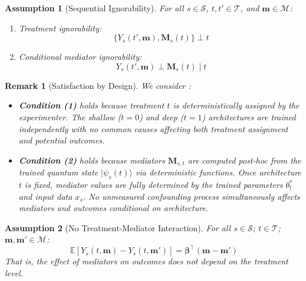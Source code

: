 \documentclass[
    reprint,
    amsmath, amssymb,
    aps,
    floatfix,
    nofootinbib
]{revtex4-1}
\newtheorem{assumption}{Assumption}
\newtheorem{remark}{Remark}
\begin{document}
\begin{assumption}[Sequential Ignorability]\label{assum:sequential_ignorability}
For all $s \in \mathcal{S}$, $t, t' \in \mathcal{T}$, and $\bm{m} \in \mathcal{M}$:
\begin{enumerate}
    \item Treatment ignorability: 
    \begin{equation}
         \{Y_s(t', \bm{m}), \bm{M}_s(t)\} \perp t
    \end{equation}
   
    \item Conditional mediator ignorability:
    \begin{equation}
        Y_s(t', \bm{m}) \perp \bm{M}_s(t) \mid t
    \end{equation}
\end{enumerate}
\end{assumption}

\begin{remark}[Satisfaction by Design] We consider : 
\begin{itemize}
    \item \textbf{Condition (1)} holds because treatment $t$ is deterministically assigned by the experimenter. The shallow ($t=0$) and deep ($t=1$) architectures are trained independently with no common causes affecting both treatment assignment and potential outcomes. 
    \item \textbf{Condition (2)} holds because mediators $\bm{M}_{s,t}$ are computed post-hoc from the trained quantum state $|\psi_s(t)\rangle$ via deterministic functions. Once architecture $t$ is fixed, mediator values are fully determined by the trained parameters $\theta_t^*$ and input data $x_s$. No unmeasured confounding process simultaneously affects mediators and outcomes conditional on architecture.
\end{itemize}
\end{remark}

\begin{assumption}[No Treatment-Mediator Interaction]\label{assum:no_interaction}  For all $s \in \mathcal{S}$; $t \in \mathcal{T}$; $\bm{m}, \bm{m}' \in \mathcal{M}$:
\begin{equation}
    \mathbb{E}[Y_s(t, \bm{m}) - Y_s(t, \bm{m}')] = \bm{\beta}^\top(\bm{m} - \bm{m}')
\end{equation}
That is, the effect of mediators on outcomes does not depend on the treatment level.
\end{assumption}
\end{document}
